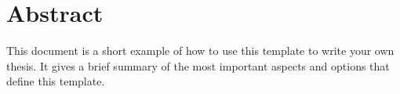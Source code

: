 \newpage
\section*{Abstract}
%

\ifhbreport \thispagestyle{plain} \else  \fi


This document is a short example of how to use this template to write your own thesis. It gives a brief summary of the most important aspects and options that define this template.
